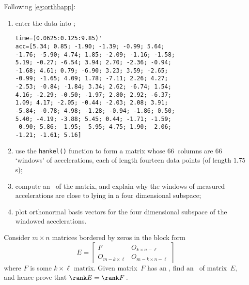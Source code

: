 \begin{exercise}
Following \autoref{eg:orthbapp}:
\begin{enumerate}
\item enter the data into \script;
\setbox\ajrqrbox\hbox{}%
\marginpar{\usebox{\ajrqrbox}}%
\begin{verbatim}
time=(0.0625:0.125:9.85)'
acc=[5.34; 0.85; -1.90; -1.39; -0.99; 5.64;
-1.76; -5.90; 4.74; 1.85; -2.09; -1.16; -1.58;
5.19; -0.27; -6.54; 3.94; 2.70; -2.36; -0.94;
-1.68; 4.61; 0.79; -6.90; 3.23; 3.59; -2.65;
-0.99; -1.65; 4.09; 1.78; -7.11; 2.26; 4.27;
-2.53; -0.84; -1.84; 3.34; 2.62; -6.74; 1.54;
4.16; -2.29; -0.50; -1.97; 2.80; 2.92; -6.37;
1.09; 4.17; -2.05; -0.44; -2.03; 2.08; 3.91;
-5.84; -0.78; 4.98; -1.28; -0.94; -1.86; 0.50;
5.40; -4.19; -3.88; 5.45; 0.44; -1.71; -1.59;
-0.90; 5.86; -1.95; -5.95; 4.75; 1.90; -2.06;
-1.21; -1.61; 5.16]
\end{verbatim}
\item use the \verb|hankel()| function to form a matrix whose 66~columns are 66 `windows' of accelerations, each of length fourteen data points (of length \(1.75\)\,s);

\item compute an \svd\ of the matrix, and explain why the windows of measured accelerations are close to lying in a four dimensional subspace;

\item plot orthonormal basis vectors for the four dimensional subspace of the windowed accelerations.
\end{enumerate}
\end{exercise}







\begin{exercise} \label{ex:rankobord} 
Consider \(m\times n\) matrices bordered by zeros in the block form
\begin{equation*}
E=\begin{bmatrix} F&O_{k\times n-\ell}
\\O_{m-k\times \ell}& O_{m-k\times n-\ell} \end{bmatrix}
\end{equation*}
where \(F\) is some \(k\times\ell\) matrix.
Given matrix~\(F\) has an \svd, find an \svd\ of matrix~\(E\), and hence prove that \(\rank E=\rank F\)\,.
\end{exercise}

